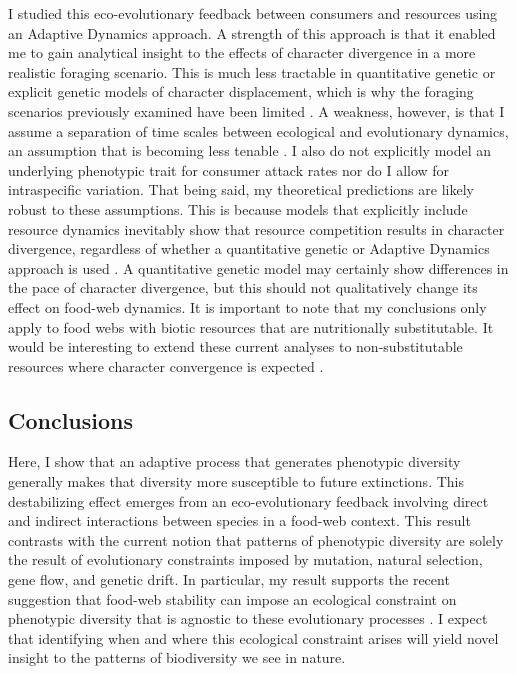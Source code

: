 \documentclass[11pt,]{article}
\begin{document}
I studied this eco-evolutionary feedback between consumers and resources
using an Adaptive Dynamics approach. A strength of this approach is that
it enabled me to gain analytical insight to the effects of character
divergence in a more realistic foraging scenario. This is much less
tractable in quantitative genetic \citep{Taper1985, McPeek2017} or
explicit genetic \citep{Doebeli1996} models of character displacement,
which is why the foraging scenarios previously examined have been
limited \citep[but see][]{McPeek2017}. A weakness, however, is that I
assume a separation of time scales between ecological and evolutionary
dynamics, an assumption that is becoming less tenable
\citep{Hairston2005, Hendry2016}. I also do not explicitly model an
underlying phenotypic trait for consumer attack rates nor do I allow for
intraspecific variation. That being said, my theoretical predictions are
likely robust to these assumptions. This is because models that
explicitly include resource dynamics inevitably show that resource
competition results in character divergence, regardless of whether a
quantitative genetic or Adaptive Dynamics approach is used
\citep{Lawlor1976, Taper1985}. A quantitative genetic model may
certainly show differences in the pace of character divergence, but this
should not qualitatively change its effect on food-web dynamics. It is
important to note that my conclusions only apply to food webs with
biotic resources that are nutritionally substitutable. It would be
interesting to extend these current analyses to non-substitutable
resources where character convergence is expected
\citep{Abrams1987, Fox2008}.

\subsection{Conclusions}\label{conclusions}

Here, I show that an adaptive process that generates phenotypic
diversity generally makes that diversity more susceptible to future
extinctions. This destabilizing effect emerges from an eco-evolutionary
feedback involving direct and indirect interactions between species in a
food-web context. This result contrasts with the current notion that
patterns of phenotypic diversity are solely the result of evolutionary
constraints imposed by mutation, natural selection, gene flow, and
genetic drift. In particular, my result supports the recent suggestion
that food-web stability can impose an ecological constraint on
phenotypic diversity that is agnostic to these evolutionary processes
\citep{Borrelli2015b}. I expect that identifying when and where this
ecological constraint arises will yield novel insight to the patterns of
biodiversity we see in nature.
\end{document}
